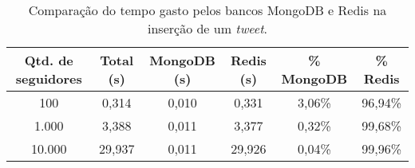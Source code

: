 \begin{table}[H]
    \centering
    \caption[Comparação do tempo gasto pelos bancos MongoDB e Redis na inserção de um tweet]{Comparação do tempo gasto pelos bancos MongoDB e Redis na inserção de um \textit{tweet}.\label{tab:percent_insert_tweet}}
    \begin{tabular}{cccccc}
        \hline
            Qtd. de seguidores & Total (s) & MongoDB (s) & Redis (s) & \% MongoDB & \% Redis \\
        \hline
            100  & 0,314 & 0,010 & 0,331 & 3,06\% & 96,94\% \\
            1.000  & 3,388 & 0,011 & 3,377 & 0,32\% & 99,68\% \\
            10.000 & 29,937 & 0,011 & 29,926 & 0,04\% & 99,96\% \\
        \hline
    \end{tabular}
\end{table}
